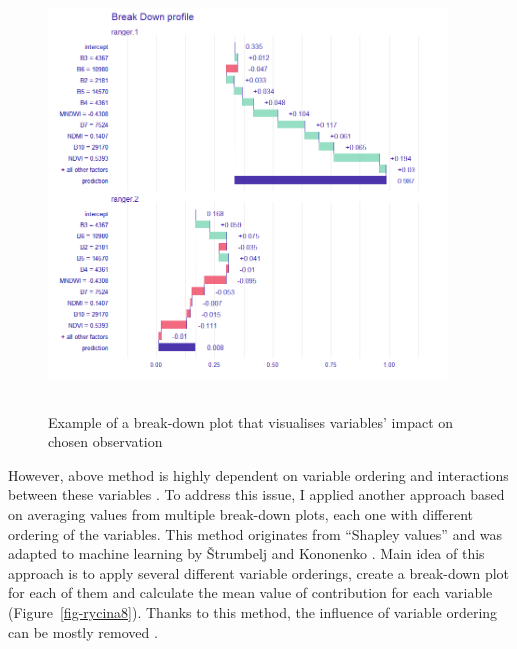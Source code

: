 \documentclass{amuthesis}
\begin{document}
\begin{figure}[t]

{\centering \includegraphics[width=4.16667in,height=4.45833in]{./figures/break-down_plot.png}

}

\caption{\label{fig-rycina7}Example of a break-down plot that visualises
variables' impact on chosen observation}

\end{figure}

However, above method is highly dependent on variable ordering and
interactions between these variables \autocite{biecek_explanatory_2021}.
To address this issue, I applied another approach based on averaging
values from multiple break-down plots, each one with different ordering
of the variables. This method originates from ``Shapley values''
\autocite{shapley_value_1953} and was adapted to machine learning by
Štrumbelj and Kononenko \autocite*{strumbelj_efficient_2010}. Main idea
of this approach is to apply several different variable orderings,
create a break-down plot for each of them and calculate the mean value
of contribution for each variable (Figure~\ref{fig-rycina8}). Thanks to
this method, the influence of variable ordering can be mostly removed
\autocite{biecek_explanatory_2021}.
\end{document}
